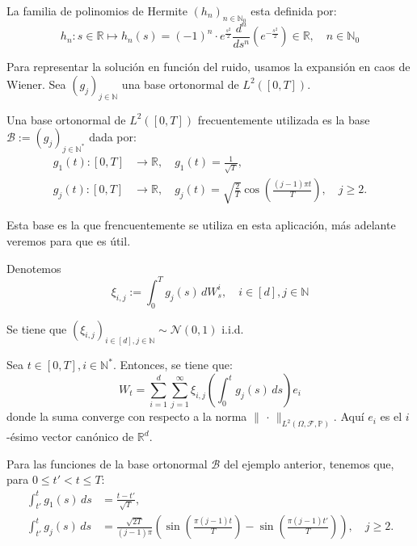 \begin{defn}
  La familia de polinomios de Hermite $(h_n)_{n \in \mathbb{N}_0}$ esta definida por:
  $$
  h_n: s\in \mathbb{R} \mapsto h_n(s) = (-1)^n\cdot e^{\frac{s^2}{2}} \frac{d^n}{d s^n}(e^{-\frac{s^2}{2}}) \in \mathbb{R},\quad n \in \mathbb{N}_0
  $$
\end{defn}

Para representar la solución en función del ruido, usamos la expansión en caos de Wiener. Sea $\left(g_j\right)_{j \in \mathbb{N}}$ una base ortonormal de $L^2([0,T])$.

\begin{ej}
  Una base ortonormal de $L^2([0,T])$ frecuentemente utilizada es la base $\mathcal{B} := (g_j)_{j \in \mathbb{N}^{*}}$ dada por:
  \[
    \begin{aligned}
      g_1(t): [0, T] &\to \mathbb{R}, \quad g_1(t) = \frac{1}{\sqrt{T}}, \\
      g_j(t): [0, T] &\to \mathbb{R}, \quad g_j(t) = \sqrt{\frac{2}{T}} \cos\left(\frac{(j - 1)\pi t}{T}\right), \quad j \geq 2.
    \end{aligned}
  \]
\end{ej}

Esta base es la que frencuentemente se utiliza en esta aplicación, más adelante veremos para que es útil.

\begin{nota}[]
  Denotemos
  \begin{equation}
    \xi_{i,j} := \int_0^T g_j(s) \, dW^{i}_s, \quad i \in [d], j \in \mathbb{N}
  \end{equation}
\end{nota}

\begin{prop}[]
  Se tiene que $(\xi_{i,j})_{i\in [d],j\in \mathbb{N}} \sim \mathcal{N}(0, 1)$ i.i.d.
\end{prop}

\begin{lema}[]
  Sea $t \in [0, T], i \in \mathbb{N}^{*}$. Entonces, se tiene que:
  \[
    W_t = \sum_{i=1}^{d} \sum_{j=1}^{\infty} \xi_{i,j} \left(\int_0^t g_j(s) \, ds \right)e_i
  \]
  donde la suma converge con respecto a la norma $\|\, \cdot\,\|_{L^2(\Omega, \mathcal{F}, \mathbb{P})}$. Aquí $e_i$ es el $i$-ésimo vector canónico de $\mathbb{R}^d$.
\end{lema}

\begin{ej}[]
  Para las funciones de la base ortonormal $\mathcal{B}$ del ejemplo anterior, tenemos que, para $0\leq t'<t \leq T$:
  \[
    \begin{aligned}
      \int_{t'}^t g_1(s) \, ds &= \frac{t - t'}{\sqrt{T}}, \\
      \int_{t'}^t g_j(s)\, ds &= \frac{\sqrt{2T}}{(j-1)\pi}\left( \sin \left( \frac{\pi(j-1)t}{T} \right) - \sin\left( \frac{\pi(j-1)t'}{T} \right) \right), \quad j \geq 2.
    \end{aligned}
  \]
\end{ej}

